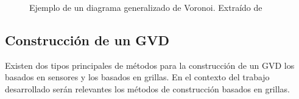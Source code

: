 \begin{figure}[H]
  \centering
  \qquad
  \caption{Ejemplo de un diagrama generalizado de Voronoi. Extraído de \cite{Wallgrun2005}}
  \label{cleanup}
\end{figure}

\subsection{Construcción de un GVD}\label{subsec:constGVD}
Existen dos tipos principales de métodos para la construcción de un GVD los basados en sensores y los basados en grillas. En el contexto del trabajo desarrollado serán relevantes los métodos de construcción basados en grillas. 

